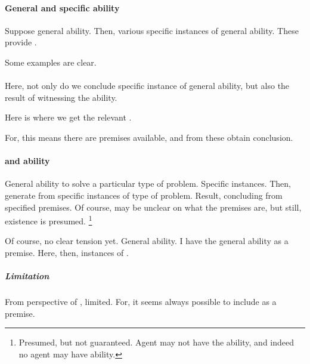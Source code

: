 \paragraph{General and specific ability}

\begin{note}
  Suppose general ability.
  Then, various specific instances of general ability.
  These provide .
\end{note}

\begin{note}[Examples]
  Some examples are clear.
\end{note}


\paragraph{}


\begin{note}
  Here, not only do we conclude specific instance of general ability, but also the result of witnessing the ability.

  Here is where we get the relevant \itp{}.

  For, this means there are premises available, and from these obtain conclusion.
\end{note}

\paragraph{\adB{} and ability}

\begin{note}
  General ability to solve a particular type of problem.
  Specific instances.
  Then, generate  from specific instances of type of problem.
  Result, concluding from specified premises.
  Of course, may be unclear on what the premises are, but still, existence is presumed.%
  \footnote{
    Presumed, but not guaranteed.
    Agent may not have the ability, and indeed no agent may have ability.
  }
\end{note}

\begin{note}
  Of course, no clear tension yet.
  General ability.
  I have the general ability as a premise.
  Here, then, instances of \adA{}.
\end{note}

\subparagraph{Limitation}

\begin{note}
  From perspective of \EAS{}, limited.
  For, it seems always possible to include \itp{} as a premise.
\end{note}


